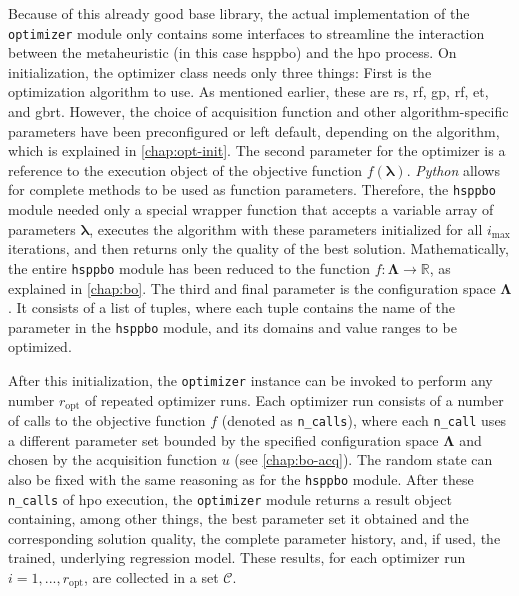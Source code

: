 Because of this already good base library, the actual implementation of the \texttt{optimizer} module only contains some interfaces to streamline the interaction between the metaheuristic (in this case \gls{hsppbo}) and the \gls{hpo} process. On initialization, the optimizer class needs only three things: 
First is the optimization algorithm to use. As mentioned earlier, these are \glsdesc{rs}, \glsdesc{rf}, \glsdesc{gp}, \glsdesc{rf}, \glsdesc{et}, and \glsdesc{gbrt}. However, the choice of acquisition function and other algorithm-specific parameters have been preconfigured or left default, depending on the algorithm, which is explained in \cref{chap:opt-init}.
The second parameter for the optimizer is a reference to the execution object of the objective function $f(\mathbf{\lambda})$. \textit{Python} allows for complete methods to be used as function parameters. Therefore, the \texttt{hsppbo} module needed only a special wrapper function that accepts a variable array of parameters $\mathbf{\lambda}$, executes the algorithm with these parameters initialized for all $i_{\text{max}}$ iterations, and then returns only the quality of the best solution. Mathematically, the entire \texttt{hsppbo} module has been reduced to the function $f: \mathcal{\mathbf{\Lambda}} \to \mathbb{R}$, as explained in \cref{chap:bo}.
The third and final parameter is the configuration space $\mathcal{\mathbf{\Lambda}}$. It consists of a list of tuples, where each tuple contains the name of the parameter in the \texttt{hsppbo} module, and its domains and value ranges to be optimized.

After this initialization, the \texttt{optimizer} instance can be invoked to perform any number $r_{\text{opt}}$ of repeated optimizer runs. Each optimizer run consists of a number of calls to the objective function $f$ (denoted as \texttt{n\_calls}), where each \texttt{n\_call} uses a different parameter set bounded by the specified configuration space $\mathcal{\mathbf{\Lambda}}$ and chosen by the acquisition function $u$ (see \cref{chap:bo-acq}). The random state can also be fixed with the same reasoning as for the \texttt{hsppbo} module. After these \texttt{n\_calls} of \gls{hpo} execution, the \texttt{optimizer} module returns a result object containing, among other things, the best parameter set it obtained and the corresponding solution quality, the complete parameter history, and, if used, the trained, underlying regression model. These results, for each optimizer run $i =1,...,r_{\text{opt}}$, are collected in a set $\mathcal{C}$.


